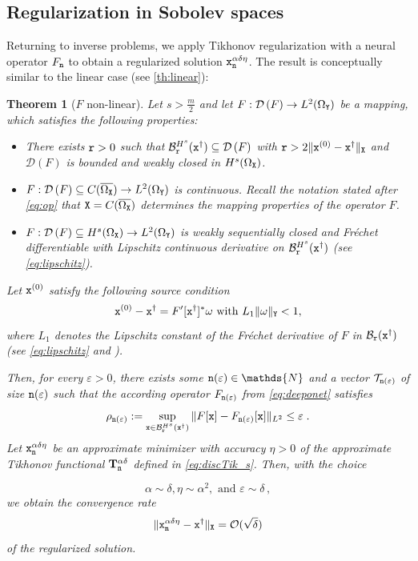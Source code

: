\documentclass[10pt]{article}
\numberwithin{equation}{section}
\newtheorem{theorem}[theorem]{Theorem}
\theoremstyle{nonumberplain}
\newcommand{\N}{\mathds{N}}
\newcommand{\dom}[1]{\mathcal{D}\left(#1\right)}
\newcommand{\norms}[1]{\|#1\|}
\newcommand{\ve}{\varepsilon}
\newcommand{\X}{{\tt X}}
\newcommand{\Y}{{\tt Y}}
\newcommand{\n}{{\tt n}}
\newcommand{\x}{{\tt x}}
\newcommand{\xdag}{\x^\dagger}
\newcommand{\Tik}{\mathbf{T}}
\begin{document}
\subsection{Regularization in Sobolev spaces}
Returning to inverse problems, we apply Tikhonov regularization with a neural operator $F_\n$ to obtain a regularized solution $\x_\n^{\alpha\delta\eta}$. The result is conceptually similar to the linear case (see \autoref{th:linear}):
\begin{theorem}[$F$ non-linear]  \label{thm:sobolevnonlin}
	Let $s > \frac{m}{2}$ and let $F: \dom{F} \to L^2(\Omega_\Y)$ be a mapping, which satisfies the following properties:

\begin{itemize}
	   \item There exists ${\tt r}>0$ such that $\mathcal{B}_{\tt r}^{H^s}(\xdag) \subseteq \dom{F}$ with  ${\tt r} > 2\norms{\x^{(0)}-\xdag}_\X$ and $\dom{F}$ is bounded and weakly closed in $H^s(\Omega_\X)$.
		\item $F : \dom{F} \subseteq C(\overline{\Omega_\X}) \to L^2(\Omega_\Y)$ is continuous. Recall the notation stated after \autoref{eq:op} that $\X=C(\overline{\Omega_\X})$ determines the mapping properties of the operator $F$.
		\item $F : \dom{F} \subseteq H^s(\Omega_\X) \to L^2(\Omega_\Y)$ is weakly sequentially closed and Fr\'echet differentiable with Lipschitz continuous derivative on $\mathcal{B}^{H^s}_{\tt r}(\xdag)$ (see \autoref{eq:lipschitz}).
\end{itemize} 
Let $\x^{(0)}$ satisfy the following source condition
	\begin{equation} \label{eq:sourcenl}
		\x^{(0)}-\xdag = F'[\xdag]^* \omega \text{ with } L_1\norms{\omega}_\Y < 1,
	\end{equation}
	where $L_1$ denotes the Lipschitz constant of the Fr\'echet derivative of $F$ in $\mathcal{B}_{\tt r}(\xdag)$ (see \autoref{eq:lipschitz} and \cite{NeuSch90}).

	Then, for every $\ve > 0$, there exists some $\n(\ve) \in \N$ and a vector $\mathcal{T}_{\n(\ve)}$ of size $\n(\ve)$ such that the according operator $F_{\n(\ve)}$ from \autoref{eq:deeponet} satisfies
\begin{equation} \label{eq:nun}
		\rho_{\n(\ve)} := \sup_{\x \in \mathcal{B}_{\tt r}^{H^s}(\xdag)} \norms{F[\x]-F_{\n(\ve)}[\x]}_{L^2} \leq \ve\;.
\end{equation}
Let $\x_{\n}^{\alpha\delta\eta}$ be an approximate minimizer with accuracy $\eta >0$ of the approximate Tikhonov functional $\Tik_{\n}^{\alpha\delta}$ defined in \autoref{eq:discTik_s}. Then,
	with the choice 

	\begin{equation} \label{eq:optimal}
		\alpha \sim \delta, \eta \sim \alpha^2,  \text{ and } \ve \sim \delta\,,
	\end{equation} 
	we obtain the convergence rate 
	\begin{equation} \label{eq:rate}
		\norms{\x_\n^{\alpha\delta\eta}-\xdag}_{\X} = \mathcal{O}(\sqrt{\delta}) 
	\end{equation} 
	of the regularized solution.
\end{theorem}
\end{document}
